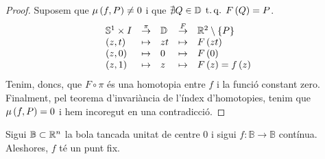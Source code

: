 \begin{proof}
    Suposem que $\mu\left( f, P \right) \neq 0$ i que $\nexists Q \in \mathbb{D} \operatorname{\;t.q.\;} F\left( Q\right) = P$.
    \[
        \begin{array}{lclcl}
            \mathbb{S}^1 \times I & \stackrel{\pi}{\to} & \mathbb{D} & \stackrel{F}{\to} & \mathbb{R} ^2 \setminus \left\{ P \right\} \\
            \left( z, t \right) & \mapsto & zt & \mapsto & F\left( zt \right) \\
            \left( z, 0 \right) & \mapsto & 0 & \mapsto & F\left( 0 \right)\\
            \left( z, 1 \right) & \mapsto & z & \mapsto & F\left( z \right) = f\left( z \right)
        \end{array}
    \]
    Tenim, doncs, que $F \circ \pi$ és una homotopia entre $f$ i la funció constant zero. Finalment, pel teorema d'invariància de l'índex d'homotopies, tenim que $\mu \left( f, P \right) = 0$ i hem incoregut en una contradicció.
\end{proof}

\begin{teo*}
    Sigui $\mathbb{B}\subset \mathbb{R} ^n$ la bola tancada unitat de centre $0$ i sigui $f\colon \mathbb{B} \to \mathbb{B}$ contínua. Aleshores, $f$ té un punt fix.
\end{teo*}

